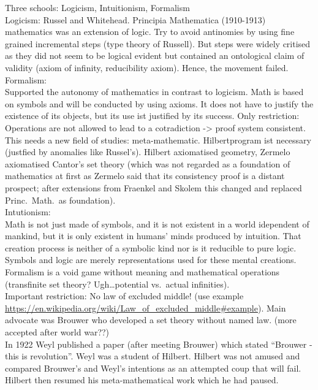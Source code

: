 \documentclass[hidelinks]{article}
\theoremstyle{plain}
\theoremstyle{definition}
\theoremstyle{rem}
\begin{document}
Three schools: Logicism, Intuitionism, Formalism\\

Logicism:
Russel and Whitehead. Principia Mathematica (1910-1913) mathematics was an extension of logic. Try to avoid antinomies by using fine grained incremental steps (type theory of Russell). But steps were widely critised as they did not seem to be logical evident but contained an ontological claim of validity (axiom of infinity, reducibility axiom). Hence, the movement failed.\\

Formalism:\\
Supported the autonomy of mathematics in contrast to logicism. Math is based on symbols and will be conducted by using axioms. It does not have to justify the existence of its objects, but its use ist justified by its success. Only restriction: Operations are not allowed to lead to a cotradiction -> proof system consistent. This needs a new field of studies: meta-mathematic. Hilbertprogram ist necessary (justfied by anomalies like Russel's). Hilbert axiomatised geometry, Zermelo axiomatised Cantor's set theory (which was not regarded as a foundation of mathematics at first as Zermelo said that its consistency proof is a distant prospect; after extensions from Fraenkel and Skolem this changed and replaced Princ.\ Math.\ as foundation).  \\

Intutionism:\\
Math is not just made of symbols, and it is not existent in a world idependent of mankind, but it is only existent in humans' minds produced by intuition. That creation process is neither of a symbolic kind nor is it reducible to pure logic. Symbols and logic are merely representations used for these mental creations. Formalism is a void game without meaning and mathematical operations (transfinite set theory? Ugh\ldots potential vs.\ actual infinities).\\
Important restriction: No law of excluded middle! (use example \url{https://en.wikipedia.org/wiki/Law\_of\_excluded\_middle#example}). Main advocate was Brouwer who developed a set theory without named law. (more accepted after world war??)\\

In 1922 Weyl published a paper (after meeting Brouwer) which stated ``Brouwer - this is revolution''. Weyl was a student of Hilbert. Hilbert was not amused and compared Brouwer's and Weyl's intentions as an attempted coup that will fail. Hilbert then resumed his meta-mathematical work which he had paused.\\
\end{document}

